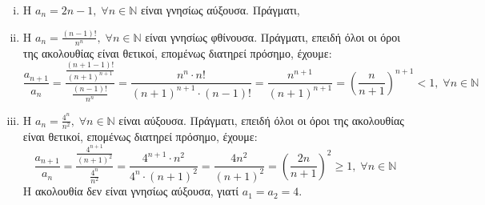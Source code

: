 \documentclass[main.tex]{subfiles}
\begin{document}
\begin{examples}
\item {}
  \begin{enumerate}[i)]
    \item Η $ a_{n} = 2n-1, \; \forall n \in \mathbb{N} $ είναι γνησίως 
      αύξουσα. Πράγματι,


    \item Η $ a_{n} = \frac{(n-1)!}{n^{n}}, \; \forall n \in 
      \mathbb{N} $ 
      είναι γνησίως φθίνουσα. Πράγματι, επειδή όλοι οι όροι της 
      ακολουθίας 
      είναι θετικοί, επομένως διατηρεί πρόσημο, έχουμε:
      \[
        \frac{a_{n+1}}{a_n} =
        \frac{\frac{(n+1-1)!}{(n+1)^{n+1}}}{\frac{(n-1)!}{n^{n}}} 
        =  \frac{n^{n}\cdot n!}{(n+1)^{n+1}\cdot (n-1)!} =
        \frac{n^{n+1}}{(n+1)^{n+1}} = \left(\frac{n}{n+1} 
        \right)^{n+1} < 1, \; \forall n
        \in \mathbb{N} 
      \] 

    \item Η $ a_{n}= \frac{4^{n}}{n^{2}}, \; \forall n \in \mathbb{N} $ 
      είναι αύξουσα. Πράγματι, επειδή όλοι οι όροι της ακολουθίας 
      είναι θετικοί, επομένως διατηρεί πρόσημο, έχουμε:
      \[
        \frac{a_{n+1}}{a_{n}} 
        = \frac{\frac{4^{n+1}}{(n+1)^{2}}}{\frac{4^{n}}{n^{2}}} 
        = \frac{4^{n+1}\cdot n^{2}}{4^{n}\cdot (n+1)^{2}} 
        = \frac{4n^{2}}{(n+1)^{2}}
        = \left( \frac{2n}{n+1} \right)^{2} \geq 1, 
        \; \forall n \in \mathbb{N} 
      \]
      Η ακολουθία δεν είναι γνησίως αύξουσα, γιατί $ 
      a_{1}= a_{2}=4$.


\end{enumerate}
\end{examples}
\end{document}
